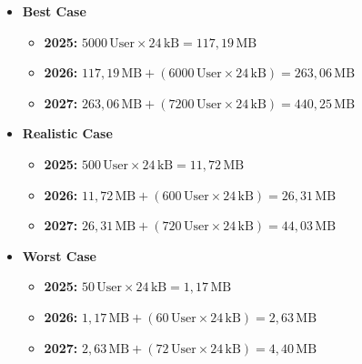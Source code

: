 \begin{itemize}
    \item \textbf{Best Case}
    \begin{itemize}
        \item \textbf{2025:} \(5000 \, \text{User} \times 24 \, \text{kB} = 117,19 \, \text{MB}\)
        \item \textbf{2026:} \(117,19 \, \text{MB} + (6000 \, \text{User} \times 24 \, \text{kB}) = 263,06 \, \text{MB}\)
        \item \textbf{2027:} \(263,06 \, \text{MB} + (7200 \, \text{User} \times 24 \, \text{kB}) = 440,25 \, \text{MB}\)
    \end{itemize}

    \item \textbf{Realistic Case}
    \begin{itemize}
        \item \textbf{2025:} \(500 \, \text{User} \times 24 \, \text{kB} = 11,72 \, \text{MB}\)
        \item \textbf{2026:} \(11,72 \, \text{MB} + (600 \, \text{User} \times 24 \, \text{kB}) = 26,31 \, \text{MB}\)
        \item \textbf{2027:} \(26,31 \, \text{MB} + (720 \, \text{User} \times 24 \, \text{kB}) = 44,03 \, \text{MB}\)
    \end{itemize}

    \item \textbf{Worst Case}
    \begin{itemize}
        \item \textbf{2025:} \(50 \, \text{User} \times 24 \, \text{kB} = 1,17 \, \text{MB}\)
        \item \textbf{2026:} \(1,17 \, \text{MB} + (60 \, \text{User} \times 24 \, \text{kB}) = 2,63 \, \text{MB}\)
        \item \textbf{2027:} \(2,63 \, \text{MB} + (72 \, \text{User} \times 24 \, \text{kB}) = 4,40 \, \text{MB}\)
    \end{itemize}
\end{itemize}

